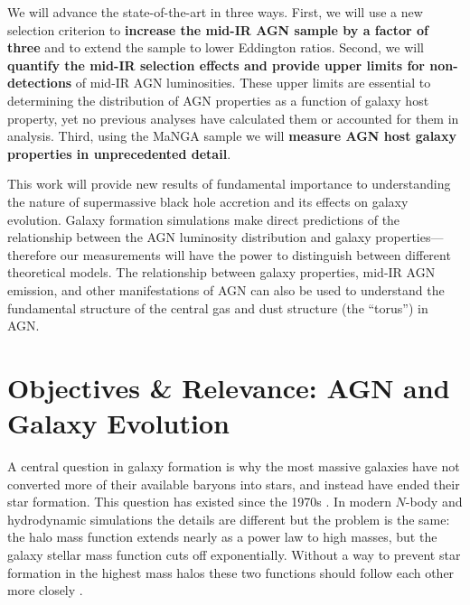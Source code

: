 \documentclass[12pt, preprint]{hacked-aastex}
\begin{document}
We will advance the state-of-the-art in three ways. First, we will use
a new selection criterion to {\bf increase the mid-IR AGN sample by a
  factor of three} and to extend the sample to lower Eddington
ratios. Second, we will {\bf quantify the mid-IR selection effects and
  provide upper limits for non-detections} of mid-IR AGN
luminosities. These upper limits are essential to determining the
distribution of AGN properties as a function of galaxy host property,
yet no previous analyses have calculated them or accounted for them in
analysis.  Third, using the MaNGA sample we will {\bf measure AGN host
  galaxy properties in unprecedented detail}.

This work will provide new results of fundamental importance to
understanding the nature of supermassive black hole accretion and its
effects on galaxy evolution.  Galaxy formation simulations make direct
predictions of the relationship between the AGN luminosity
distribution and galaxy properties---therefore our measurements will
have the power to distinguish between different theoretical
models. The relationship between galaxy properties, mid-IR AGN
emission, and other manifestations of AGN can also be used to
understand the fundamental structure of the central gas and dust
structure (the ``torus'') in AGN.

\section{Objectives \& Relevance: AGN and Galaxy Evolution}\label{sec:intro}


A central question in galaxy formation is why the most massive
galaxies have not converted more of their available baryons into
stars, and instead have ended their star formation. This question has
existed since the 1970s \cite{white78a}.  In modern $N$-body and
hydrodynamic simulations the details are different but the problem is
the same: the halo mass function extends nearly as a power law to high
masses, but the galaxy stellar mass function cuts off exponentially.
Without a way to prevent star formation in the highest mass halos
these two functions should follow each other more closely
\cite{benson03a, somerville15a}.
\end{document}
